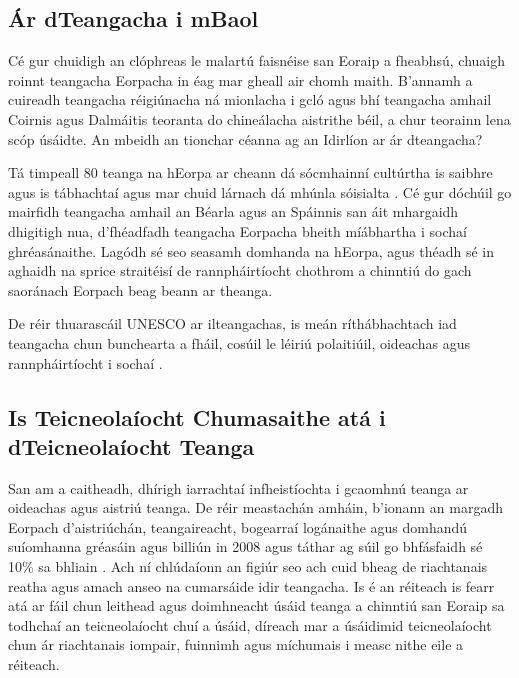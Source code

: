 \documentclass[]{../../metanetpaper}
\begin{document}
\begin{multicols}{2}
\subsection{Ár dTeangacha i mBaol}

Cé gur chuidigh an clóphreas le malartú faisnéise san Eoraip a fheabhsú, chuaigh roinnt teangacha Eorpacha in éag mar gheall air chomh maith. B’annamh a cuireadh teangacha réigiúnacha ná mionlacha i gcló agus bhí teangacha amhail Coirnis agus Dalmáitis teoranta do chineálacha aistrithe béil, a chur teorainn lena scóp úsáidte. An mbeidh an tionchar céanna ag an Idirlíon ar ár dteangacha?

Tá timpeall 80 teanga na hEorpa ar cheann dá sócmhainní cultúrtha is saibhre agus is tábhachtaí agus mar chuid lárnach dá mhúnla sóisialta \cite{EC2}.  Cé gur dóchúil go mairfidh teangacha amhail an Béarla agus an Spáinnis san áit mhargaidh dhigitigh nua, d’fhéadfadh teangacha Eorpacha bheith mí\-ábhartha i sochaí ghréasánaithe. Lagódh sé seo seasamh domhanda na hEorpa, agus théadh sé in aghaidh na sprice straitéisí de rannpháirtíocht chothrom a chinntiú do gach saoránach Eorpach beag beann ar theanga.  



De réir thuarascáil UNESCO ar ilteangachas, is meán ríthábhachtach iad teangacha chun bunchearta a fháil, cosúil le léiriú polaitiúil, oideachas agus rannpháirtíocht i sochaí \cite{Unesco1}.

\subsection{Is Teicneolaíocht Chumasaithe atá i dTeicneolaíocht Teanga}

San am a caitheadh, dhírigh iarrachtaí infheistíochta i gcaomhnú teanga ar oideachas agus aistriú teanga. De réir meastachán amháin, b’ionann an margadh Eorpach d’aistriúchán, teangaireacht, bogearraí logánaithe agus domhandú suíomhanna gréasáin agus  billiún in 2008 agus táthar ag súil go bhfásfaidh sé 10\% sa bhliain \cite{EC3}.  Ach ní chlúdaíonn an figiúr seo ach cuid bheag de riachtanais reatha agus amach anseo na cumarsáide idir teangacha. Is é an réiteach is fearr atá ar fáil chun leithead agus doimhneacht úsáid teanga a chinntiú san Eoraip sa todhchaí an teicneolaíocht chuí a úsáid, díreach mar a úsáidimid teicneolaíocht chun ár riachtanais iompair, fuinnimh agus míchumais i measc nithe eile a réiteach.


\end{multicols}
\end{document}
